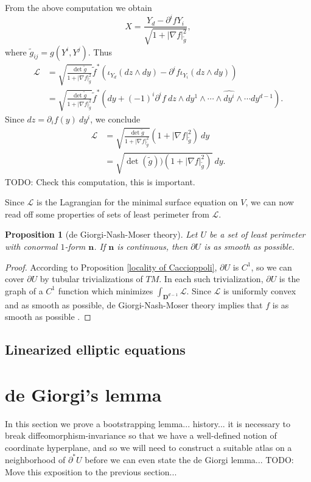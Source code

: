 \documentclass[reqno,12pt,letterpaper]{amsart}
\newcommand{\DD}{\mathbf{D}}
\newcommand{\normal}{\mathbf n}
\newtheorem{proposition}[theorem]{Proposition}
\theoremstyle{definition}
\numberwithin{equation}{section}
\begin{document}
From the above computation we obtain
$$X = \frac{Y_d - \partial^i f Y_i}{\sqrt{1 + |\nabla f|_{\tilde g}^2}},$$
where $\tilde g_{ij} = g(Y^i, Y^j)$.
Thus
\begin{align*}
\mathscr L &= \sqrt{\frac{\det \tilde g}{1 + |\nabla f|_{\tilde g}^2}} \tilde f^* \left(\iota_{Y_d}(dz \wedge dy) - \partial^i f \iota_{Y_i}(dz \wedge dy) \right)\\
&= \sqrt{\frac{\det \tilde g}{1 + |\nabla f|_{\tilde g}^2}} \tilde f^* \left(dy + (-1)^i \partial^i f ~dz \wedge dy^1 \wedge \cdots \wedge \widehat{dy^i} \wedge \cdots dy^{d - 1}\right).
\end{align*}
Since $dz = \partial_i f(y) ~dy^i$, we conclude
\begin{align*}
\mathscr L &= \sqrt{\frac{\det \tilde g}{1 + |\nabla f|_{\tilde g}^2}} (1 + |\nabla f|_{\tilde g}^2) ~dy\\
&= \sqrt{\det(\tilde g))(1 + |\nabla f|_{\tilde g}^2)} ~dy.
\end{align*}
TODO: Check this computation, this is important.

Since $\mathscr L$ is the Lagrangian for the minimal surface equation on $V$, we can now read off some properties of sets of least perimeter from $\mathscr L$.

\begin{proposition}[de Giorgi-Nash-Moser theory]\label{regularity of reduced boundary}
Let $U$ be a set of least perimeter with conormal $1$-form $\normal$.
If $\normal$ is continuous, then $\partial U$ is as smooth as possible.
\end{proposition}
\begin{proof}
According to Proposition \ref{locality of Caccioppoli}, $\partial U$ is $C^1$, so we can cover $\partial U$ by tubular trivializations of $TM$.
In each such trivialization, $\partial U$ is the graph of a $C^1$ function which minimizes $\int_{\DD^{d - 1}} \mathscr L$.
Since $\mathscr L$ is uniformly convex and as smooth as possible, de Giorgi-Nash-Moser theory implies that $f$ is as smooth as possible \cite{morrey2009multiple}.
\end{proof}

\subsection{Linearized elliptic equations}



\section{de Giorgi's lemma}
In this section we prove a bootstrapping lemma... history...
it is necessary to break diffeomorphism-invariance so that we have a well-defined notion of coordinate hyperplane, and so we will need to construct a suitable atlas on a neighborhood of $\partial^* U$ before we can even state the de Giorgi lemma... TODO: Move this exposition to the previous section...
\end{document}
